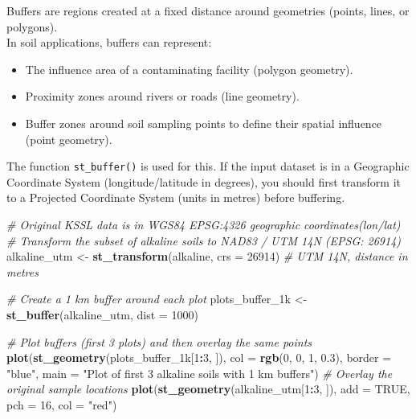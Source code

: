\documentclass[
  10pt,
  b5paper,
  oneside]{book}
\newenvironment{Shaded}{\begin{snugshade}}{\end{snugshade}}
\newcommand{\AttributeTok}[1]{\textcolor[rgb]{0.13,0.29,0.53}{#1}}
\newcommand{\CommentTok}[1]{\textcolor[rgb]{0.56,0.35,0.01}{\textit{#1}}}
\newcommand{\ConstantTok}[1]{\textcolor[rgb]{0.56,0.35,0.01}{#1}}
\newcommand{\DecValTok}[1]{\textcolor[rgb]{0.00,0.00,0.81}{#1}}
\newcommand{\FloatTok}[1]{\textcolor[rgb]{0.00,0.00,0.81}{#1}}
\newcommand{\FunctionTok}[1]{\textcolor[rgb]{0.13,0.29,0.53}{\textbf{#1}}}
\newcommand{\NormalTok}[1]{#1}
\newcommand{\OtherTok}[1]{\textcolor[rgb]{0.56,0.35,0.01}{#1}}
\newcommand{\SpecialCharTok}[1]{\textcolor[rgb]{0.81,0.36,0.00}{\textbf{#1}}}
\newcommand{\StringTok}[1]{\textcolor[rgb]{0.31,0.60,0.02}{#1}}
\providecommand{\tightlist}{%
  \setlength{\itemsep}{0pt}\setlength{\parskip}{0pt}}
\begin{document}
Buffers are regions created at a fixed distance around geometries (points, lines, or polygons).\\
In soil applications, buffers can represent:

\begin{itemize}
\tightlist
\item
  The influence area of a contaminating facility (polygon geometry).
\item
  Proximity zones around rivers or roads (line geometry).
\item
  Buffer zones around soil sampling points to define their spatial influence (point geometry).
\end{itemize}

The function \texttt{st\_buffer()} is used for this. If the input dataset is in a Geographic Coordinate System (longitude/latitude in degrees), you should first transform it to a Projected Coordinate System (units in metres) before buffering.

\begin{Shaded}
\begin{Highlighting}[]
\CommentTok{\# Original KSSL data is in WGS84 EPSG:4326  geographic coordinates(lon/lat)}
\CommentTok{\# Transform the subset of alkaline soils to NAD83 / UTM 14N (EPSG: 26914)}
\NormalTok{alkaline\_utm }\OtherTok{\textless{}{-}} \FunctionTok{st\_transform}\NormalTok{(alkaline, }\AttributeTok{crs =} \DecValTok{26914}\NormalTok{)  }\CommentTok{\# UTM 14N, distance in metres}

\CommentTok{\# Create a 1 km buffer around each plot}
\NormalTok{plots\_buffer\_1k }\OtherTok{\textless{}{-}} \FunctionTok{st\_buffer}\NormalTok{(alkaline\_utm, }\AttributeTok{dist =} \DecValTok{1000}\NormalTok{)}

\CommentTok{\# Plot buffers (first 3 plots) and then overlay the same points}
\FunctionTok{plot}\NormalTok{(}\FunctionTok{st\_geometry}\NormalTok{(plots\_buffer\_1k[}\DecValTok{1}\SpecialCharTok{:}\DecValTok{3}\NormalTok{, ]), }
     \AttributeTok{col =} \FunctionTok{rgb}\NormalTok{(}\DecValTok{0}\NormalTok{, }\DecValTok{0}\NormalTok{, }\DecValTok{1}\NormalTok{, }\FloatTok{0.3}\NormalTok{), }\AttributeTok{border =} \StringTok{"blue"}\NormalTok{,}
     \AttributeTok{main =} \StringTok{"Plot of first 3 alkaline soils with 1 km buffers"}\NormalTok{)}
\CommentTok{\# Overlay the original sample locations}
\FunctionTok{plot}\NormalTok{(}\FunctionTok{st\_geometry}\NormalTok{(alkaline\_utm[}\DecValTok{1}\SpecialCharTok{:}\DecValTok{3}\NormalTok{, ]), }
     \AttributeTok{add =} \ConstantTok{TRUE}\NormalTok{, }\AttributeTok{pch =} \DecValTok{16}\NormalTok{, }\AttributeTok{col =} \StringTok{"red"}\NormalTok{)}
\end{Highlighting}
\end{Shaded}
\end{document}
